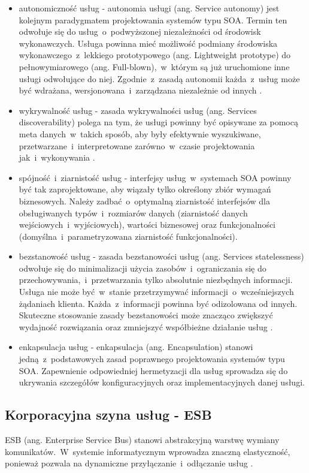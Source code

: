 \begin{itemize}
\item{autonomiczność usług - autonomia usługi (ang. Service autonomy) jest kolejnym paradygmatem projektowania systemów typu SOA. Termin ten odwołuje się do usług~o~podwyższonej niezależności od środowisk wykonawczych. Usługa powinna mieć możliwość podmiany środowiska wykonawczego~z~lekkiego prototypowego (ang. Lightweight prototype) do pełnowymiarowego (ang. Full-blown),~w~którym są już uruchomione inne usługi odwołujące do niej. Zgodnie~z~zasadą autonomii każda~z~usług może być wdrażana, wersjonowana~i~zarządzana niezależnie od innych \cite{SOAinfoq10}.}
\item{wykrywalność usług - zasada wykrywalności usług (ang. Services discoverability) polega na tym, że usługi powinny być opisywane za pomocą meta danych~w~takich sposób, aby były efektywnie wyszukiwane, przetwarzane~i~interpretowane zarówno~w~czasie projektowania jak~i~wykonywania \cite{SOAinfoq10}.}
\item{spójność~i~ziarnistość usług - interfejsy usług~w~systemach SOA powinny być tak zaprojektowane, aby wiązały tylko określony zbiór wymagań biznesowych. \cite{SOAsdj102009} Należy zadbać~o~optymalną ziarnistość interfejsów dla obsługiwanych typów~i~rozmiarów danych (ziarnistość danych wejściowych~i~wyjściowych), wartości biznesowej oraz funkcjonalności (domyślna~i~parametryzowana ziarnistość funkcjonalności).}
\item{bezstanowość usług - zasada bezstanowości usług (ang. Services statelessness) odwołuje się do minimalizacji użycia zasobów~i~ograniczania się do przechowywania,~i~przetwarzania tylko absolutnie niezbędnych informacji. Usługa nie może być~w~stanie przetrzymywać informacji~o~wcześniejszych żądaniach klienta. Każda~z~informacji powinna być odizolowana od innych. Skuteczne stosowanie zasady bezstanowości może znacząco zwiększyć wydajność rozwiązania oraz zmniejszyć współbieżne działanie usług \cite{SOAsdj102009}.}
\item{enkapsulacja usług - enkapsulacja (ang. Encapsulation) stanowi jedną~z~podstawowych zasad poprawnego projektowania systemów typu SOA. Zapewnienie odpowiedniej hermetyzacji dla usług sprowadza się do ukrywania szczegółów konfiguracyjnych oraz implementacyjnych danej usługi.}
\end{itemize}

\subsection{Korporacyjna szyna usług - ESB}
ESB (ang. Enterprise Service Bus) stanowi abstrakcyjną warstwę wymiany komunikatów.~W~systemie informatycznym wprowadza znaczną elastyczność, ponieważ pozwala na dynamiczne przyłączanie~i~odłączanie usług \cite{PlatIntGor}.


